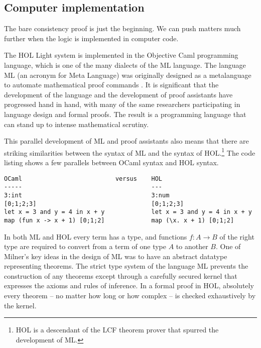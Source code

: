 \documentclass[brochure,english,12pt]{bourbaki}
\theoremstyle{plain}
\begin{document}
\subsection{Computer implementation}

The bare consistency proof is just the beginning.  We can push matters
much further when the logic is implemented in computer code.

The HOL Light system is implemented in the Objective Caml programming
language, which is one of the many dialects of the ML language.  The
language ML (an acronym for Meta Language) was originally designed as
a metalanguage to automate mathematical proof commands \cite{Gor}.  It
is significant that the development of the language and the
development of proof assistants have progressed hand in hand, with
many of the same researchers participating in language design and
formal proofs.  The result is a programming language that can stand up
to intense mathematical scrutiny.

This parallel development of ML and proof assistants also means that
there are striking similarities between the syntax of ML and the
syntax of HOL.\footnote{HOL is a descendant of the LCF
  theorem prover that spurred the development of ML.}  The code
listing shows a few parallels between OCaml syntax and HOL syntax.

\begin{lstlisting}[keepspaces=true,stringstyle=\tt,basicstyle=\small,frame=single,framesep=8pt,mathescape,morekeywords={type,let,and,in,OCaml,HOL},columns=flexible]
OCaml                          versus    HOL
-----                                    ---
3:int                                    3:num
[0;1;2;3]                                [0;1;2;3]  
let x = 3 and y = 4 in x + y             let x = 3 and y = 4 in x + y
map (fun x -> x + 1) [0;1;2]             map (\x. x + 1) [0;1;2]
\end{lstlisting}



In both ML and HOL every term has a type, and functions $f:A\to B$ of
the right type are required to convert from a term of one type $A$ to
another $B$.  One of Milner's key ideas in the design of ML was to
have an abstract datatype representing theorems.  The strict type
system of the language ML prevents the construction of any theorems
except through a carefully secured kernel that expresses the axioms
and rules of inference.  In a formal proof in HOL, absolutely every theorem -- no
matter how long or how complex -- is checked exhaustively by the
kernel.
\end{document}
